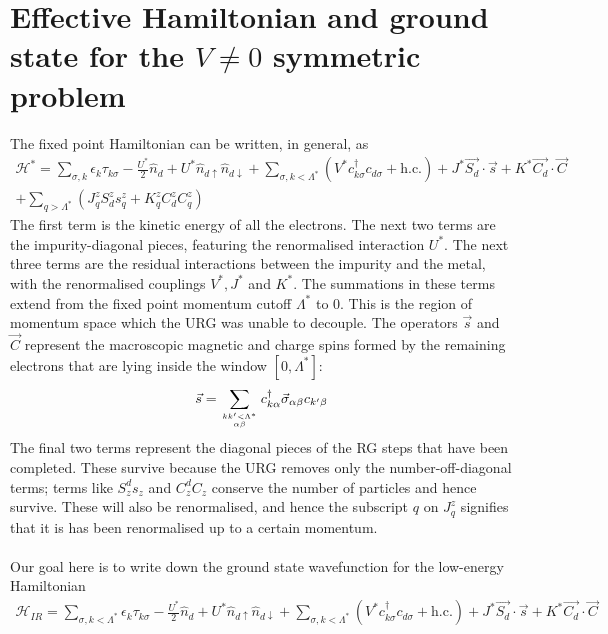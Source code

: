 \documentclass[twoside]{report}
\numberwithin{equation}{section}
\begin{document}
\section{Effective Hamiltonian and ground state for the \(V\neq 0\) symmetric problem}
The fixed point Hamiltonian can be written, in general, as
\begin{equation}\begin{aligned}
	\mathcal{H}^* = \sum_{\sigma, k}\epsilon_k \tau_{k\sigma} - \frac{U^*}{2}\hat n_d + U^* \hat n_{d\uparrow}\hat n_{d\downarrow} + \sum_{\sigma, k < \Lambda^*}\left( V^* c^\dagger_{k\sigma}c_{d\sigma} + \text{h.c.} \right) + J^* \vec{S_d}\cdot\vec{s} + K^* \vec{C_d}\cdot\vec{C} \\
	+ \sum_{q > \Lambda^*}\left(J^z_q S^z_ds^z_q + K^z_q C^z_dC^z_q\right) 
\end{aligned}\end{equation}
The first term is the kinetic energy of all the electrons. The next two terms are the impurity-diagonal pieces, featuring the renormalised interaction \(U^*\). The next three terms are the residual interactions between the impurity and the metal, with the renormalised couplings \(V^*, J^*\) and \(K^*\). The summations in these terms extend from the fixed point momentum cutoff \(\Lambda^*\) to 0. This is the region of momentum space  which the URG was unable to decouple. The operators \(\vec s\) and \(\vec C\) represent the macroscopic magnetic and charge spins formed by the remaining electrons that are lying inside the window \(\left[ 0, \Lambda^* \right] \):
\begin{equation}\begin{aligned}
	\vec s = \sum_{kk^\prime<\Lambda^*\atop{\alpha\beta}} c^\dagger_{k\alpha}\vec \sigma_{\alpha\beta}c_{k^\prime\beta}
\end{aligned}\end{equation}
The final two terms represent the diagonal pieces of the RG steps that have been completed. These survive because the URG removes only the number-off-diagonal terms; terms like \(S^d_z s_z\) and \(C^d_z C_z\) conserve the number of particles and hence survive. These will also be renormalised, and hence the subscript \(q\) on \(J^z_q\) signifies that it is has been renormalised up to a certain momentum.
\\\\Our goal here is to write down the ground state wavefunction for the low-energy Hamiltonian
\begin{equation}\begin{aligned}
	\label{fixed_point_ham}
	\mathcal{H}_{IR} = \sum_{\sigma, k<\Lambda^*}\epsilon_k \tau_{k\sigma} - \frac{U^*}{2}\hat n_d + U^* \hat n_{d\uparrow}\hat n_{d\downarrow} + \sum_{\sigma, k < \Lambda^*}\left( V^* c^\dagger_{k\sigma}c_{d\sigma} + \text{h.c.} \right) + J^* \vec{S_d}\cdot\vec{s} + K^* \vec{C_d}\cdot\vec{C}
\end{aligned}\end{equation}
\end{document}

